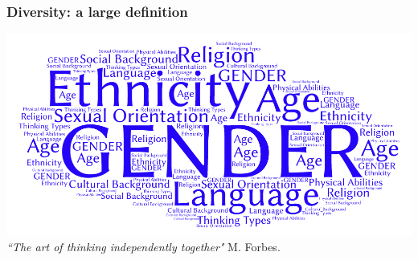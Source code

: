 \begin{frame}
\frametitle{Diversity: a large definition }
\vskip 0.7cm
\hspace{-1.0cm}\includegraphics[width=1.1\textwidth]{./pictures/Word-Cloud-diversity.png}
\vskip 0.3cm
\emph{``The art of thinking independently together"} M. Forbes.
\end{frame}
